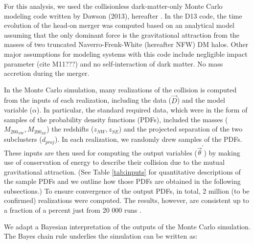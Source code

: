 For this analysis, we used the collisionless 
dark-matter-only Monte Carlo modeling code written by Dawson (2013),
hereafter .  
In the D13 code, the time evolution of the head-on merger was computed
based on an analytical model assuming that the only dominant force is the gravitational attraction from
the masses of two truncated Naverro-Frenk-White (hereafter NFW) DM halos.
Other major assumptions for modeling systems with this code include
negligible impact parameter (cite M11???) and no self-interaction of dark matter.
No mass accretion during the merger. 
\par

In the Monte Carlo simulation, many realizations of the collision is
computed from the inputs of each realization, including
the data ($\vec{D}$) and the model variable ($\alpha$). In particular,
the standard required data, which were in the form of samples of the
probability density functions (PDFs), included the masses ($M_{200_{NW}},M_{200_{SE}}$) the
redshifts ($z_{NW}, z_{SE}$) and the projected separation of the two
subclusters ($d_{proj}$).  
In each realization, we randomly drew samples of the PDFs.
%
These inputs are then used for computing the output variables
($\vec{\theta}^\prime$) by making use of conservation of energy to describe
their collision due to the mutual gravitational attraction.
(See Table \ref{tab:inputs}
for quantitative descriptions of the sample PDFs and we outline how those
PDFs are obtained in the following subsections.) 
To ensure convergence of the output PDFs, in total, 2 million (to be
confirmed) realizations were computed. The results, however, are
consistent up to a fraction of a percent just from 20 000 runs
.\par    
We adapt a Bayesian interpretation of the outputs of the Monte Carlo
simulation. The Bayes chain rule underlies the simulation can be written as:

